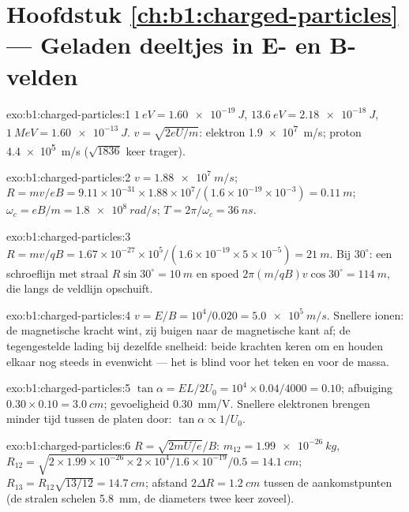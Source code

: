 \section*{Hoofdstuk \ref{ch:b1:charged-particles} --- Geladen deeltjes in E- en B-velden}

\begin{solution}{exo:b1:charged-particles:1}
$\qty{1}{eV} = \qty{1.60e-19}{J}$, $\qty{13.6}{eV} = \qty{2.18e-18}{J}$,
$\qty{1}{MeV} = \qty{1.60e-13}{J}$. $v = \sqrt{2eU/m}$: elektron
\qty{1.9e7}{m/s}; proton \qty{4.4e5}{m/s} ($\sqrt{1836}$ keer trager).
\end{solution}

\begin{solution}{exo:b1:charged-particles:2}
$v = \qty{1.88e7}{m/s}$; $R = mv/eB = 9.11\times10^{-31} \times 1.88\times10^7/
(1.6\times10^{-19} \times 10^{-3}) = \qty{0.11}{m}$; $\omega_c = eB/m =
\qty{1.8e8}{rad/s}$; $T = 2\pi/\omega_c = \qty{36}{ns}$.
\end{solution}

\begin{solution}{exo:b1:charged-particles:3}
$R = mv/qB = 1.67\times10^{-27} \times 10^5/(1.6\times10^{-19} \times 5\times
10^{-5}) = \qty{21}{m}$. Bij $30^\circ$: een schroeflijn met straal $R\sin 30^\circ
= \qty{10}{m}$ en spoed $2\pi(m/qB)v\cos 30^\circ = \qty{114}{m}$, die
langs de veldlijn opschuift.
\end{solution}

\begin{solution}{exo:b1:charged-particles:4}
$v = E/B = 10^4/0.020 = \qty{5.0e5}{m/s}$. Snellere ionen: de magnetische kracht
wint, zij buigen naar de magnetische kant af; de tegengestelde lading bij dezelfde
snelheid: beide krachten keren om en houden elkaar nog steeds in evenwicht --- het
 is blind voor het teken en voor de massa.
\end{solution}

\begin{solution}{exo:b1:charged-particles:5}
$\tan\alpha = EL/2U_0 = 10^4 \times 0.04/4000 = 0.10$; afbuiging
$0.30 \times 0.10 = \qty{3.0}{cm}$; gevoeligheid \qty{0.30}{mm/V}. Snellere
elektronen brengen minder tijd tussen de platen door: $\tan\alpha \propto 1/U_0$.
\end{solution}

\begin{solution}{exo:b1:charged-particles:6}
$R = \sqrt{2mU/e}/B$: $m_{12} = \qty{1.99e-26}{kg}$, $R_{12} = \sqrt{2 \times
1.99\times10^{-26} \times 2\times10^4/1.6\times10^{-19}}/0.5 = \qty{14.1}{cm}$;
$R_{13} = R_{12}\sqrt{13/12} = \qty{14.7}{cm}$; afstand $2\Delta R =
\qty{1.2}{cm}$ tussen de aankomstpunten (de stralen schelen \qty{5.8}{mm},
de diameters twee keer zoveel).
\end{solution}

